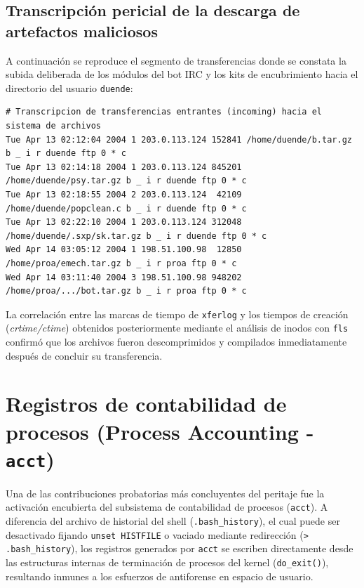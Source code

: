 \subsection{Transcripción pericial de la descarga de artefactos maliciosos}

A continuación se reproduce el segmento de transferencias donde se constata la subida deliberada de los módulos del bot IRC y los kits de encubrimiento hacia el directorio del usuario \texttt{duende}:

\begin{lstlisting}[style=terminal]
# Transcripcion de transferencias entrantes (incoming) hacia el sistema de archivos
Tue Apr 13 02:12:04 2004 1 203.0.113.124 152841 /home/duende/b.tar.gz b _ i r duende ftp 0 * c
Tue Apr 13 02:14:18 2004 1 203.0.113.124 845201 /home/duende/psy.tar.gz b _ i r duende ftp 0 * c
Tue Apr 13 02:18:55 2004 2 203.0.113.124  42109 /home/duende/popclean.c b _ i r duende ftp 0 * c
Tue Apr 13 02:22:10 2004 1 203.0.113.124 312048 /home/duende/.sxp/sk.tar.gz b _ i r duende ftp 0 * c
Wed Apr 14 03:05:12 2004 1 198.51.100.98  12850 /home/proa/emech.tar.gz b _ i r proa ftp 0 * c
Wed Apr 14 03:11:40 2004 3 198.51.100.98 948202 /home/proa/.../bot.tar.gz b _ i r proa ftp 0 * c
\end{lstlisting}

La correlación entre las marcas de tiempo de \texttt{xferlog} y los tiempos de creación (\textit{crtime/ctime}) obtenidos posteriormente mediante el análisis de inodos con \texttt{fls} confirmó que los archivos fueron descomprimidos y compilados inmediatamente después de concluir su transferencia.

\section{Registros de contabilidad de procesos (Process Accounting - \texttt{acct})}

Una de las contribuciones probatorias más concluyentes del peritaje fue la activación encubierta del subsistema de contabilidad de procesos (\texttt{acct}). A diferencia del archivo de historial del shell (\texttt{.bash\_history}), el cual puede ser desactivado fijando \texttt{unset HISTFILE} o vaciado mediante redirección (\texttt{> .bash\_history}), los registros generados por \texttt{acct} se escriben directamente desde las estructuras internas de terminación de procesos del kernel (\texttt{do\_exit()}), resultando inmunes a los esfuerzos de antiforense en espacio de usuario.

